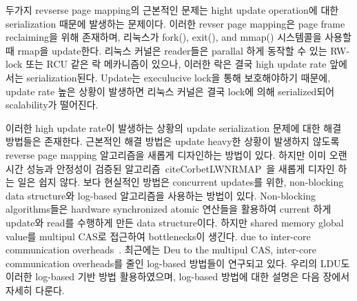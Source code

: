 \ifkor
두가지 revserse page mapping의 근본적인 문제는 hight update operation에 대한 serialization 때문에
발생하는 문제이다.
이러한 revser page mapping은 page frame reclaiming을 위해 존재하며, 리눅스가 fork(), exit(),
and mmap() 시스템콜을 사용할 때 rmap을 update한다.
리눅스 커널은 reader들은 parallal 하게 동작할 수 있는 RW-lock 또는 RCU 같은 락 메카니즘이 있으나, 이러한 락은 결국
high update rate 앞에서는 serialization된다.
Update는 execulucive lock을 통해 보호해야하기 때문에, update rate 높은 상황이 발생하면 리눅스
커널은 결국 lock에 의해 serialized되어 scalability가 떨어진다.
\else

\fi


\ifkor
이러한 high update rate이 발생하는 상황의 update serialization 문제에 대한 해결 방법들은 존재한다. 
근본적인 해결 방법은 update heavy한 상황이 발생하지 않도록 reverse page mapping 알고리즘을 새롭게 디자인하는 방법이
있다.
하지만 이미 오랜 시간 성능과 안정성이 검증된 알고리즘~cite{CorbetLWNRMAP}~\cite{CorbetLWNANON}을 새롭게
디자인 하는 일은 쉽지 않다.
보다 현실적인 방법은 concurrent updates를 위한, non-blocking data structure와
log-based 알고리즘을 사용하는 방법이 있다.
Non-blocking algorithms들은 hardware synchronized atomic 연산들을 활용하여 current 하게
update와 read를 수행하게 만든 data structure이다.
하지만 shared memory global value를 multipul CAS로 접근하여 bottlenecks이 생긴다.
due to inter-core communication overheads~\cite{SilasBoydWickizerPth}.
최근에는 Deu to the multipul CAS, inter-core communication overheads를 줄인 log-based
방법들이 연구되고 있다.
우리의 LDU도 이러한 log-based 기반 방법 활용하였으며, log-based 방법에 대한 설명은 다음 장에서 자세히 다룬다.
\else


\fi













